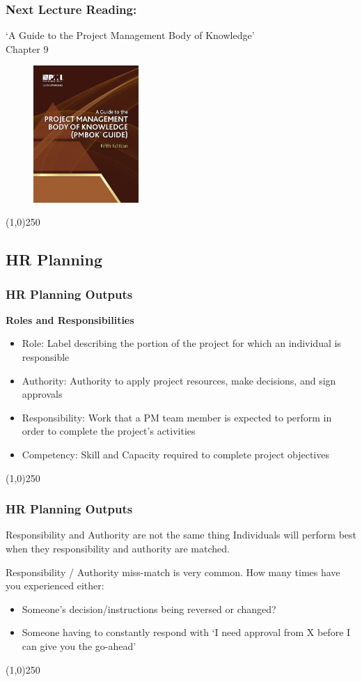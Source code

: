 \begin{frame}
\frametitle{Next Lecture \hfill Reading:}
`A Guide to the Project Management Body of Knowledge'\\ 
Chapter 9
\begin{figure}[h]
	\centering
		\includegraphics[width = 4cm]{images/book.jpg}
\end{figure}
\end{frame}\begin{center}\line(1,0){250}\end{center}
\subsection{HR Planning}


 
\begin{frame}
\frametitle{HR Planning Outputs}
\textbf{Roles and Responsibilities}
\begin{itemize}
	\item Role: Label describing the portion of the project for which an individual is responsible
	\item Authority: Authority to apply project resources, make decisions, and sign approvals
	\item Responsibility: Work that a PM team member is expected to perform in order to complete the project's activities
	\item Competency: Skill and Capacity required to complete project objectives
\end{itemize}
\end{frame}\begin{center}\line(1,0){250}\end{center}


\begin{frame}
\frametitle{HR Planning Outputs}
\begin{block}{Responsibility and Authority are not the same thing}
Individuals will perform best when they responsibility and authority are matched.
\end{block}
Responsibility / Authority miss-match is very common.  How many times have you experienced either:
\begin{itemize}
	\item Someone's decision/instructions being reversed or changed? 
	\item Someone having to constantly respond with `I need approval from X before I can give you the go-ahead'
\end{itemize}
\end{frame}\begin{center}\line(1,0){250}\end{center}
 
